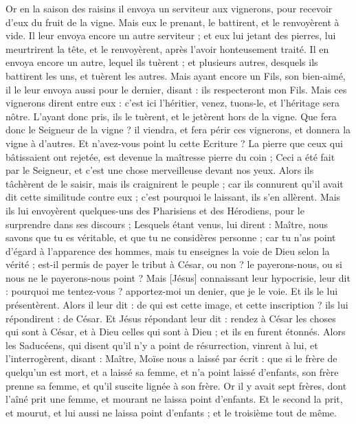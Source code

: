 \begin{multicols}{2}
Or en la saison des raisins il envoya un serviteur aux vignerons, pour recevoir d'eux du fruit de la vigne.
Mais eux le prenant, le battirent, et le renvoyèrent à vide.
Il leur envoya encore un autre serviteur ; et eux lui jetant des pierres, lui meurtrirent la tête, et le renvoyèrent, après l'avoir honteusement traité.
Il en envoya encore un autre, lequel ils tuèrent ; et plusieurs autres, desquels ils battirent les uns, et tuèrent les autres.
Mais ayant encore un Fils, son bien-aimé, il le leur envoya aussi pour le dernier, disant : ils respecteront mon Fils.
Mais ces vignerons dirent entre eux : c'est ici l'héritier, venez, tuons-le, et l'héritage sera nôtre.
L'ayant donc pris, ils le tuèrent, et le jetèrent hors de la vigne.
Que fera donc le Seigneur de la vigne ? il viendra, et fera périr ces vignerons, et donnera la vigne à d'autres.
Et n'avez-vous point lu cette Ecriture ? La pierre que ceux qui bâtissaient ont rejetée, est devenue la maîtresse pierre du coin ;
Ceci a été fait par le Seigneur, et c'est une chose merveilleuse devant nos yeux.
Alors ils tâchèrent de le saisir, mais ils craignirent le peuple ; car ils connurent qu'il avait dit cette similitude contre eux ; c'est pourquoi le laissant, ils s'en allèrent.
Mais ils lui envoyèrent quelques-uns des Pharisiens et des Hérodiens, pour le surprendre dans ses discours ;
Lesquels étant venus, lui dirent : Maître, nous savons que tu es véritable, et que tu ne considères personne ; car tu n'as point d'égard à l'apparence des hommes, mais tu enseignes la voie de Dieu selon la vérité ; est-il permis de payer le tribut à César, ou non ? le payerons-nous, ou si nous ne le payerons-nous point ?
Mais [Jésus] connaissant leur hypocrisie, leur dit : pourquoi me tentez-vous ? apportez-moi un denier, que je le voie.
Et ils le lui présentèrent. Alors il leur dit : de qui est cette image, et cette inscription ? ils lui répondirent : de César.
Et Jésus répondant leur dit : rendez à César les choses qui sont à César, et à Dieu celles qui sont à Dieu ; et ils en furent étonnés.
Alors les Saducéens, qui disent qu'il n'y a point de résurrection, vinrent à lui, et l'interrogèrent, disant :
Maître, Moïse nous a laissé par écrit : que si le frère de quelqu'un est mort, et a laissé sa femme, et n'a point laissé d'enfants, son frère prenne sa femme, et qu'il suscite lignée à son frère.
Or il y avait sept frères, dont l'aîné prit une femme, et mourant ne laissa point d'enfants.
Et le second la prit, et mourut, et lui aussi ne laissa point d'enfants ; et le troisième tout de même.

\end{multicols}
